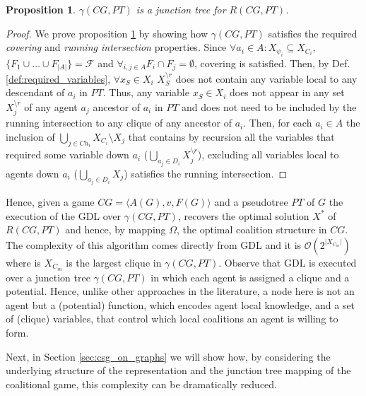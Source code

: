 \documentclass{aamas2012}
\newtheorem{proposition}{Proposition}
\begin{document}
\noindent\begin{proposition}
\noindent$\gamma(CG, PT)$ is a junction tree for $R(CG, PT)$.
\label{prop:valid_tree_decomposition}
\end{proposition}
\begin{proof}
 We prove proposition \ref{prop:valid_tree_decomposition} by showing
how $\gamma(CG, PT)$ satisfies the required \emph{covering} and \emph{running
intersection} properties. Since $\forall a_i \in A: X_{\psi_i} \subseteq
X_{C_i}$, $\{F_1 \cup \ldots \cup F_{\vert A \vert}\}=\mathcal{F}$ and
$\forall_{i,j\in A} F_i\cap F_j = \emptyset$, covering is satisfied. Then, by
Def. \ref{def:required_variables}, $\forall x_S\in X_i$ $X^{\setminus
r}_S$ does not contain any variable local to any descendant of $a_i$ in $PT$.
Thus, any variable $x_S\in X_i$ does not appear in any set $X^{\setminus r}_j$
of any agent $a_j$ ancestor of $a_i$ in $PT$ and does not need to be included by
the running intersection to any clique of any ancestor of $a_i$. Then, for
each $a_i\in A$ the inclusion of $\bigcup_{j\in Ch_i}
X_{C_i} \setminus X_j$ that contains by recursion all the variables that
required some variable down $a_i$ ($\bigcup_{a_j\in D_i}X^{\setminus r}_j$),
excluding all variables local to agents down $a_i$ ($\bigcup_{a_j\in D_i}X_j $)
satisfies the running intersection.
\end{proof}
\noindent Hence, given a game $CG=\langle A(G), v, F(G) \rangle$
and a pseudotree $PT$ of $G$ the execution of the GDL over
$\gamma( CG, PT )$, recovers the optimal solution $X^*$ of $R(CG, PT)$ and
hence, by mapping $\Omega$, the optimal coalition structure in $CG$. The
complexity of this algorithm comes directly from GDL and it is
$\mathcal{O}(2^{\vert X_{C_m} \vert})$ where is $X_{C_m}$ is the largest clique
in $\gamma( CG, PT )$. 
Observe that GDL is executed over a junction tree $\gamma( CG, PT )$ in which
each agent is assigned a clique and a potential. Hence,
unlike other approaches in the literature, a node here is not an agent but a
(potential) function, which encodes agent local knowledge, and a set of (clique)
variables, that control which local coalitions an agent is willing to
form.

 Next, in Section \ref{sec:csg_on_graphs} we
will show how, by considering the underlying structure of the representation and the junction tree mapping of the
coalitional game, this complexity can be dramatically reduced.
\end{document}
